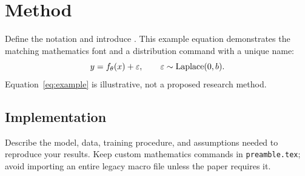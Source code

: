 \section{Method}
\label{sec:method}

Define the notation and introduce \methodname. This example equation demonstrates
the matching mathematics font and a distribution command with a unique name:
\begin{equation}
    y = f_{\theta}(x) + \varepsilon,
    \qquad \varepsilon \sim \operatorname{Laplace}(0,b).
    \label{eq:example}
\end{equation}
Equation~\ref{eq:example} is illustrative, not a proposed research method.

\subsection{Implementation}
Describe the model, data, training procedure, and assumptions needed to reproduce
your results. Keep custom mathematics commands in \texttt{preamble.tex}; avoid
importing an entire legacy macro file unless the paper requires it.
